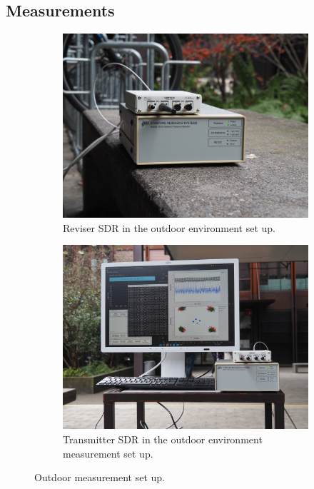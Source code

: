 \subsection{Measurements}


\begin{figure}
	\centering
	\hfill
	\begin{subfigure}[t]{.47\linewidth}
		\includegraphics[frame, width = \linewidth]{figures/picture/PC210002.JPG}
		\caption{
			Reviser SDR in the outdoor environment set up.
			\label{fig:sdr1}
		}
	\end{subfigure}
	\hfill
	\begin{subfigure}[t]{.47\linewidth}
		\centering
		\includegraphics[frame, width = \linewidth]{figures/picture/PC210011.JPG}
		\caption{
		 Transmitter SDR in the outdoor environment measurement set up.
			\label{fig:sdr2}
		}
	\end{subfigure}
	\hfill
	\caption{
		Outdoor measurement set up.
		\label{fig:mesurement-set-up-outside}
	}
\end{figure}


